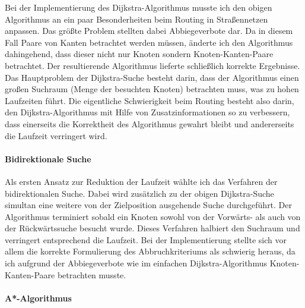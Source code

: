 \documentclass[twoside, a4paper]{scrartcl}
\begin{document}
Bei der Implementierung des Dijkstra-Algorithmus musste ich den obigen Algorithmus an ein paar Besonderheiten beim Routing in Straßennetzen anpassen. Das größte Problem stellten dabei Abbiegeverbote dar. Da in diesem Fall Paare von Kanten betrachtet werden müssen, änderte ich den Algorithmus dahingehend, dass dieser nicht nur Knoten sondern Knoten-Kanten-Paare betrachtet. Der resultierende Algorithmus lieferte schließlich korrekte Ergebnisse. 
\\
 Das Hauptproblem der Dijkstra-Suche besteht darin, dass der Algorithmus einen großen Suchraum (Menge der besuchten Knoten) betrachten muss, was zu hohen Laufzeiten führt. Die eigentliche Schwierigkeit beim Routing besteht also darin, den Dijkstra-Algorithmus mit Hilfe von Zusatzinformationen so zu verbessern, dass einerseits die Korrektheit des Algorithmus gewahrt bleibt und andererseits die Laufzeit verringert wird. 

\paragraph{Bidirektionale Suche}
\label{sec:bidirektionale-suche}

Als ersten Ansatz zur Reduktion der Laufzeit wählte ich das Verfahren der bidirektionalen Suche. Dabei wird zusätzlich zu der obigen Dijkstra-Suche simultan eine weitere von der Zielposition ausgehende Suche durchgeführt. Der Algorithmus terminiert sobald ein Knoten sowohl von der Vorwärts- als auch von der Rückwärtssuche besucht wurde. Dieses Verfahren halbiert den Suchraum und verringert entsprechend die Laufzeit. Bei der Implementierung stellte sich vor allem die korrekte Formulierung des Abbruchkriteriums als schwierig heraus, da ich aufgrund der Abbiegeverbote wie im einfachen Dijkstra-Algorithmus Knoten-Kanten-Paare betrachten musste. 

\paragraph{ A*-Algorithmus}
\label{sec:eins-von-heur}
\end{document}
